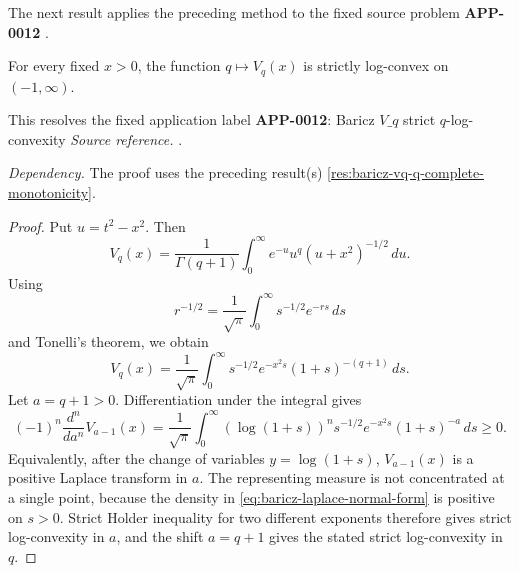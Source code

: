 The next result applies the preceding method to the fixed source problem \textbf{APP-0012} \cite{baricz-turan-thesis}.
\begin{corollary}
\label{res:baricz-vq-strict-q-logconvexity}
For every fixed \(x>0\), the function \(q\mapsto V_q(x)\) is strictly log-convex on \((-1,\infty)\).

This resolves the fixed application label \textbf{APP-0012}: Baricz \(V\_q\) strict \(q\)-log-convexity
\emph{Source reference.} \cite{baricz-turan-thesis}.

\emph{Dependency.} The proof uses the preceding result(s) \ref{res:baricz-vq-q-complete-monotonicity}.
\end{corollary}
\begin{proof}
Put \(u=t^2-x^2\).  Then
\begin{equation}
\label{eq:baricz-u-normal-form}
V_q(x)=\frac1{\Gamma(q+1)}
\int_0^\infty e^{-u}u^q(u+x^2)^{-1/2}\,du.
\end{equation}
Using
\[
r^{-1/2}=\frac1{\sqrt\pi}\int_0^\infty s^{-1/2}e^{-rs}\,ds
\]
and Tonelli's theorem, we obtain
\begin{equation}
\label{eq:baricz-laplace-normal-form}
V_q(x)=\frac1{\sqrt\pi}\int_0^\infty
s^{-1/2}e^{-x^2s}(1+s)^{-(q+1)}\,ds.
\end{equation}
Let \(a=q+1>0\).  Differentiation under the integral gives
\begin{equation}
\label{eq:baricz-complete-monotonicity}
(-1)^n\frac{d^n}{da^n}V_{a-1}(x)
=\frac1{\sqrt\pi}\int_0^\infty
(\log(1+s))^n s^{-1/2}e^{-x^2s}(1+s)^{-a}\,ds\ge0.
\end{equation}
Equivalently, after the change of variables \(y=\log(1+s)\), \(V_{a-1}(x)\) is a positive Laplace transform in \(a\).  The representing measure is not concentrated at a single point, because the density in \eqref{eq:baricz-laplace-normal-form} is positive on \(s>0\).  Strict Holder inequality for two different exponents therefore gives strict log-convexity in \(a\), and the shift \(a=q+1\) gives the stated strict log-convexity in \(q\).
\end{proof}

